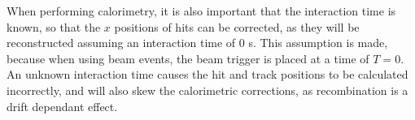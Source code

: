 When performing calorimetry, it is also important that the interaction time is known, so that the $x$ positions of hits can be corrected, as they will be reconstructed assuming an interaction time of 0 s. This assumption is made, because when using beam events, the beam trigger is placed at a time of $T = 0$. An unknown interaction time causes the hit and track positions to be calculated incorrectly, and will also skew the calorimetric corrections, as recombination is a drift dependant effect.
